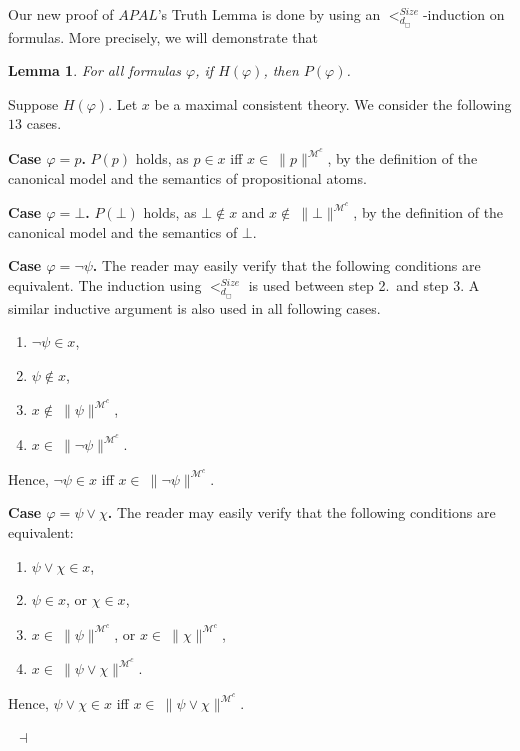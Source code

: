 \documentclass{article}[12pt]
\newtheorem{lemma}{Lemma}
\newenvironment{proof}{\noindent {\bf Proof \ }}{\hfill ~$\dashv$}
\newcommand{\hans}[1]{}
\renewcommand{\phi}{\varphi}
\begin{document}
Our new proof of $APAL$'s Truth Lemma is done by using an $<_{d_{\Box}}^{Size}$-induction on formulas.
More precisely, we will demonstrate that

\begin{lemma}\label{induction_bb}
For all formulas $\phi$, if $H(\phi)$, then $P(\phi)$.
\end{lemma}
\begin{proof}
Suppose $H(\phi)$.
Let $x$ be a maximal consistent theory.
We consider the following $13$ cases.


\medskip \noindent 
{\bf Case $\phi=p$.}
\hans{Chang\'e} $P(p)$ holds, as $p \in x$ iff $x \in \ \parallel p \parallel^{\mathcal{M}^{c}}$, by the definition of the canonical model and the semantics of propositional atoms. 

\medskip  \noindent 
{\bf Case $\phi=\bot$.}
$P(\bot)$ holds, as $\bot \not\in x$ and $x\not\in \ \parallel\bot\parallel^{\mathcal{M}^{c}}$, by the definition of the canonical model and the semantics of $\bot$. 

\medskip  \noindent 
{\bf Case $\phi=\neg\psi$.}
The reader may easily verify that the following conditions are equivalent.
The induction using $<^{Size}_{d_\Box}$ is used between step 2.\ and step 3. A similar inductive argument is also used in all following cases. 
\begin{enumerate}
\item $\neg\psi\in x$,
\item $\psi\not\in x$,
\item $x\not\in \ \parallel\psi\parallel^{\mathcal{M}^{c}}$,
\item $x\in \ \parallel\neg\psi\parallel^{\mathcal{M}^{c}}$.
\end{enumerate}
Hence, $\neg\psi\in x$ iff $x\in \ \parallel\neg\psi\parallel^{\mathcal{M}^{c}}$.


\medskip \noindent 
{\bf Case $\phi=\psi\vee\chi$.}
The reader may easily verify that the following conditions are equivalent:
\begin{enumerate}
\item $\psi\vee\chi\in x$,
\item $\psi\in x$, or $\chi\in x$,
\item $x\in \ \parallel\psi\parallel^{\mathcal{M}^{c}}$, or $x\in \ \parallel\chi\parallel^{\mathcal{M}^{c}}$,
\item $x\in \ \parallel\psi\vee\chi\parallel^{\mathcal{M}^{c}}$.
\end{enumerate}
Hence, $\psi\vee\chi\in x$ iff $x\in \ \parallel\psi\vee\chi\parallel^{\mathcal{M}^{c}}$.



\end{proof}
\end{document}

